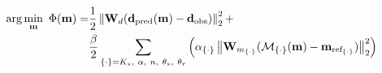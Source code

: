 \begin{equation}
\label{eq:richards-joint-inversion}
\begin{aligned}
{\rm arg}\min_{\mathbf{m}}\ \Phi ( \mathbf{m} ) =&
\frac{1}{2} \left\|\mathbf{W}_d (\mathbf{d}_{\rm pred}(\mathbf{m})- \mathbf{d}_{\rm obs}) \right\|^2_2 + \\
&\frac { \beta  }{ 2 }
\sum_{\{\cdot\} = K_s,~\alpha,~n,~\theta_s,~\theta_r}
\left(
    \alpha_{\{\cdot \}}
    \left\|
        \mathbf{W}_{m_{\{\cdot \}}}
        (\mathcal{M}_{\{\cdot \}}(\mathbf{m})- \mathbf{m}_{\rm ref_{\{\cdot \}} })
    \right\|^2_2
\right)
\end{aligned}
\end{equation}

